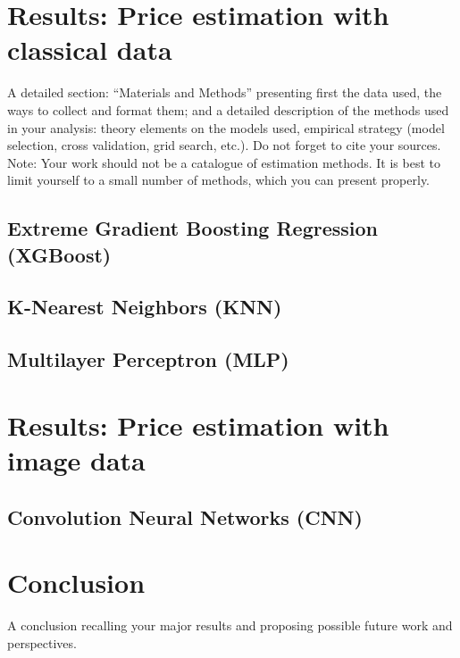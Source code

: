 \documentclass[12pt]{article}
\begin{document}
\section{Results: Price estimation with classical data}
A detailed section: “Materials and Methods” presenting first the data used, the ways to collect and
format them; and a detailed description of the methods used in your analysis: theory elements on
the models used, empirical strategy (model selection, cross validation, grid search, etc.). Do not
forget to cite your sources.
Note: Your work should not be a catalogue of estimation methods. It is best to limit yourself to a
small number of methods, which you can present properly.

\subsection{Extreme Gradient Boosting Regression (XGBoost)}
\subsection{K-Nearest Neighbors (KNN)}
\subsection{Multilayer Perceptron (MLP)}

\section{Results: Price estimation with image data}
\subsection{Convolution Neural Networks (CNN)}



\section{Conclusion}
A conclusion recalling your major results and proposing possible future work and perspectives.
\end{document}

